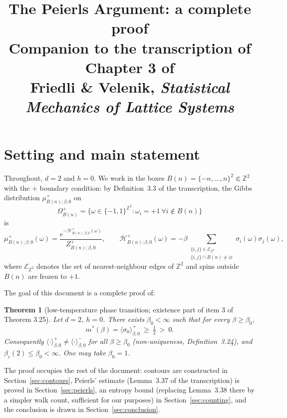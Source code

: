 \documentclass[11pt]{article}
\title{\textbf{The Peierls Argument: a complete proof}\\[4pt]
\large Companion to the transcription of Chapter 3 of\\
Friedli \& Velenik, \emph{Statistical Mechanics of Lattice Systems}}
\author{}
\date{}
\theoremstyle{plain}
\newtheorem{theorem}{Theorem}[section]
\theoremstyle{definition}
\theoremstyle{remark}
\newcommand{\Z}{\mathbb{Z}}
\newcommand{\fin}{\Subset}          %
\newcommand{\sg}{\sigma}
\newcommand{\Ham}{\mathcal{H}}
\newcommand{\Eset}{\mathscr{E}}
\newcommand{\meanp}[1]{\langle #1 \rangle^{+}}
\newcommand{\meanm}[1]{\langle #1 \rangle^{-}}
\begin{document}
\maketitle

\noindent{}

\section{Setting and main statement}
\label{sec:setting}

Throughout, $d=2$ and $h=0$. We work in the boxes
$B(n)=\{-n,\dots,n\}^2\fin\Z^2$ with the $+$ boundary condition: by
Definition~3.3 of the transcription, the Gibbs distribution
$\mu^{+}_{B(n);\beta,0}$ on
\[
  \Omega^{+}_{B(n)}
  =\{\omega\in\{-1,1\}^{\Z^2} : \omega_i=+1 \ \forall i\notin B(n)\}
\]
is
\[
  \mu^{+}_{B(n);\beta,0}(\omega)
    =\frac{e^{-\Ham^{+}_{B(n);\beta,0}(\omega)}}{Z^{+}_{B(n);\beta,0}},
  \qquad
  \Ham^{+}_{B(n);\beta,0}(\omega)
    =-\beta\!\!\sum_{\substack{\{i,j\}\in\Eset_{\Z^2}\\ \{i,j\}\cap B(n)\neq\varnothing}}\!\!
       \sg_i(\omega)\sg_j(\omega),
\]
where $\Eset_{\Z^2}$ denotes the set of nearest-neighbour edges of $\Z^2$ and
spins outside $B(n)$ are frozen to $+1$.

The goal of this document is a complete proof of:

\begin{theorem}[low-temperature phase transition; existence part of item 3 of Theorem 3.25]
\label{thm:main}
Let $d=2$, $h=0$. There exists $\beta_0<\infty$ such that for every
$\beta\ge\beta_0$,
\[
  m^*(\beta)=\meanp{\sg_0}_{\beta,0}\ \ge\ \tfrac12\ >\ 0 .
\]
Consequently $\meanp{\cdot}_{\beta,0}\neq\meanm{\cdot}_{\beta,0}$ for all
$\beta\ge\beta_0$ (non-uniqueness, Definition~3.24), and
$\beta_c(2)\le\beta_0<\infty$. One may take $\beta_0=1$.
\end{theorem}

The proof occupies the rest of the document: contours are constructed in
Section~\ref{sec:contours}, Peierls' estimate (Lemma~3.37 of the
transcription) is proved in Section~\ref{sec:peierls}, an entropy bound
(replacing Lemma~3.38 there by a simpler walk count, sufficient for our
purposes) in Section~\ref{sec:counting}, and the conclusion is drawn
in Section~\ref{sec:conclusion}.
\end{document}
